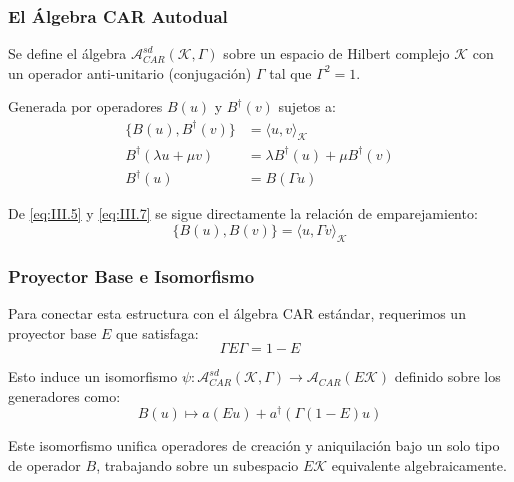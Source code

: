 \begin{frame}
  \frametitle{El Álgebra CAR Autodual}

  Se define el álgebra $\mathcal{A}_{CAR}^{sd}(\mathcal{K}, \Gamma)$ sobre un espacio de Hilbert complejo $\mathcal{K}$ con un operador anti-unitario (conjugación) $\Gamma$ tal que $\Gamma^2 = 1$. 
  
  Generada por operadores $B(u)$ y $B^{\dagger}(v)$ sujetos a:
  \begin{align}
    \{B(u), B^{\dagger}(v)\} &= \langle u, v \rangle_{\mathcal{K}} \label{eq:III.5} \\
    B^{\dagger}(\lambda u + \mu v) &= \lambda B^{\dagger}(u) + \mu B^{\dagger}(v) \label{eq:III.6} \\
    B^{\dagger}(u) &= B(\Gamma u) \label{eq:III.7}
  \end{align}

  De \eqref{eq:III.5} y \eqref{eq:III.7} se sigue directamente la relación de emparejamiento:
  \begin{equation*}
      \{B(u), B(v)\} = \langle u, \Gamma v \rangle_{\mathcal{K}}
  \end{equation*}
\end{frame}

\begin{frame}
  \frametitle{Proyector Base e Isomorfismo}

  Para conectar esta estructura con el álgebra CAR estándar, requerimos un proyector base $E$ que satisfaga:
  \begin{equation}
    \Gamma E \Gamma = 1 - E
    \label{eq:III.8}
  \end{equation}

  Esto induce un isomorfismo $\psi: \mathcal{A}_{CAR}^{sd}(\mathcal{K}, \Gamma) \longrightarrow \mathcal{A}_{CAR}(E\mathcal{K})$ definido sobre los generadores como:
  \begin{equation}
    B(u) \mapsto a(Eu) + a^{\dagger}(\Gamma(1-E)u)
    \label{eq:III.9}
  \end{equation}

  \vspace{0.2cm}
  Este isomorfismo unifica operadores de creación y aniquilación bajo un solo tipo de operador $B$, trabajando sobre un subespacio $E\mathcal{K}$ equivalente algebraicamente.
\end{frame}

